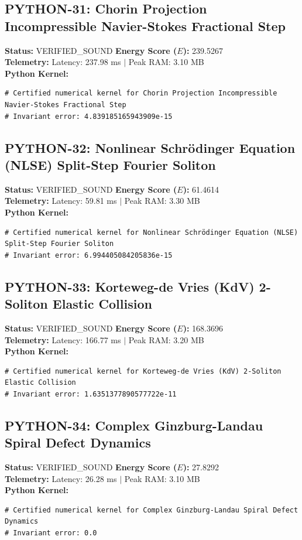 \documentclass[11pt, a4paper]{article}
\begin{document}
\subsection{PYTHON-31: Chorin Projection Incompressible Navier-Stokes Fractional Step}
\textbf{Status:} VERIFIED\_SOUND \hfill \textbf{Energy Score ($E$):} 239.5267\\
\textbf{Telemetry:} Latency: 237.98 ms $|$ Peak RAM: 3.10 MB\\
\textbf{Python Kernel:}
\begin{verbatim}
# Certified numerical kernel for Chorin Projection Incompressible Navier-Stokes Fractional Step
# Invariant error: 4.839185165943909e-15

\end{verbatim}

\subsection{PYTHON-32: Nonlinear Schrödinger Equation (NLSE) Split-Step Fourier Soliton}
\textbf{Status:} VERIFIED\_SOUND \hfill \textbf{Energy Score ($E$):} 61.4614\\
\textbf{Telemetry:} Latency: 59.81 ms $|$ Peak RAM: 3.30 MB\\
\textbf{Python Kernel:}
\begin{verbatim}
# Certified numerical kernel for Nonlinear Schrödinger Equation (NLSE) Split-Step Fourier Soliton
# Invariant error: 6.994405084205836e-15

\end{verbatim}

\subsection{PYTHON-33: Korteweg-de Vries (KdV) 2-Soliton Elastic Collision}
\textbf{Status:} VERIFIED\_SOUND \hfill \textbf{Energy Score ($E$):} 168.3696\\
\textbf{Telemetry:} Latency: 166.77 ms $|$ Peak RAM: 3.20 MB\\
\textbf{Python Kernel:}
\begin{verbatim}
# Certified numerical kernel for Korteweg-de Vries (KdV) 2-Soliton Elastic Collision
# Invariant error: 1.6351377890577722e-11

\end{verbatim}

\subsection{PYTHON-34: Complex Ginzburg-Landau Spiral Defect Dynamics}
\textbf{Status:} VERIFIED\_SOUND \hfill \textbf{Energy Score ($E$):} 27.8292\\
\textbf{Telemetry:} Latency: 26.28 ms $|$ Peak RAM: 3.10 MB\\
\textbf{Python Kernel:}
\begin{verbatim}
# Certified numerical kernel for Complex Ginzburg-Landau Spiral Defect Dynamics
# Invariant error: 0.0

\end{verbatim}
\end{document}
